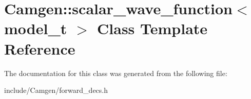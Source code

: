 \hypertarget{a00501}{}\section{Camgen\+:\+:scalar\+\_\+wave\+\_\+function$<$ model\+\_\+t $>$ Class Template Reference}
\label{a00501}


The documentation for this class was generated from the following file\+:\begin{DoxyCompactItemize}
\item 
include/\+Camgen/forward\+\_\+decs.\+h\end{DoxyCompactItemize}
